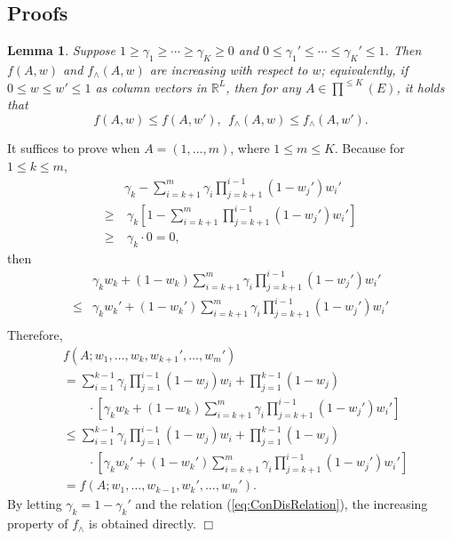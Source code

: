 \documentclass{article}
\newcommand{\RR}{\mathbb{R}}
\newtheorem{lemma}[theorem]{Lemma}%
\newenvironment{proof}{\noindent {\textbf{Proof. }}}{$\Box$ \medskip}
\begin{document}
\subsection{Proofs}

\begin{lemma}
\label{lem:increasing} 
Suppose $1 \geq \gamma_1 \geq \cdots \geq \gamma_K \geq 0$ and $0 \leq \gamma_1' \leq \cdots \leq \gamma_K' \leq 1$. Then $f(A, w)$ and $f_{\wedge}(A, w)$ are increasing with respect to $w$; equivalently, if $0 \leq w \leq w' \leq 1$ as column vectors in $\RR^L$, then for any $A \in \prod^{\leq K}(E)$, it holds that
$$
f(A, w) \leq f(A, w'), ~~ f_{\wedge}(A, w) \leq f_{\wedge}(A, w').
$$
\end{lemma}
\begin{proof}
It suffices to prove when $A = (1, \ldots, m)$, where $1 \leq m \leq K$. Because for $1 \leq k \leq m$,
\begin{align*}
&\gamma_{k} - \sum_{i=k+1}^m \gamma_i \prod_{j = k + 1}^{i - 1} (1 - w_j') w_i'\\
\geq &~\gamma_k [1 - \sum_{i=k+1}^m \prod_{j=k+1}^{i-1}(1 - w_j') w_i']\\
\geq &~\gamma_{k} \cdot 0 = 0,
\end{align*}
then
\begin{align*}
&\gamma_k w_k + (1 - w_k)\sum_{i=k+1}^m \gamma_i \prod_{j=k+1}^{i-1}(1 - w_j') w_i'\\
\leq &\gamma_k w_k' + (1 - w_k')\sum_{i=k+1}^m \gamma_i \prod_{j=k+1}^{i-1}(1 - w_j') w_i'\\
\end{align*}
Therefore, 
\begin{align*}
& f(A; w_1, \dots, w_k, w_{k+1}', \dots, w_m')\\
&=\sum_{i=1}^{k-1} \gamma_i \prod_{j=1}^{i-1}(1 - w_j) w_i + \prod_{j=1}^{k-1}(1 - w_j) \\
&\qquad \cdot [\gamma_k w_k + (1 - w_k)\sum_{i=k+1}^m \gamma_i \prod_{j=k+1}^{i-1}(1 - w_j') w_i']\\
&\leq \sum_{i=1}^{k-1} \gamma_i \prod_{j=1}^{i-1}(1 - w_j) w_i + \prod_{j=1}^{k-1}(1 - w_j) \\
&\qquad \cdot [\gamma_k w_k' + (1 - w_k')\sum_{i=k+1}^m \gamma_i \prod_{j=k+1}^{i-1}(1 - w_j') w_i']\\
&=f(A; w_1, \ldots, w_{k-1}, w_{k}', \ldots, w_m').
\end{align*}
By letting $\gamma_k = 1 - \gamma_k'$ and the relation (\ref{eq:ConDisRelation}), the increasing property of $f_{\wedge}$ is obtained directly.
\end{proof}
\end{document}

